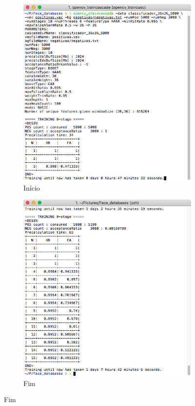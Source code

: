 \begin{figure}[htbp]
    \centering
    \caption{Treinamento do classificador em cascata usando \texttt{opencv\_traincascade}}
   \label{fig:opencv_traincascade}
    \begin{subfigure}[t]{0.49\textwidth}
    \centering
    \includegraphics[width=0.95\linewidth]{imagens/opencv_traincascade_inicio.png}
    \caption{Início}\label{fig:opencv_traincascade:a}
    \end{subfigure}
    \begin{subfigure}[t]{0.49\textwidth}
    \centering
    \includegraphics[width=0.95\linewidth]{imagens/opencv_traincascade_fim.png}
    \caption{Fim}\label{fig:opencv_traincascade:b}
    \end{subfigure}
\end{figure}

